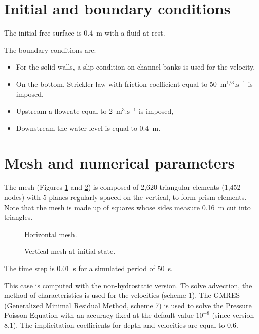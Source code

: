 \section{Initial and boundary conditions}
%
\bigskip
The initial free surface is 0.4~m with a fluid at rest.

\bigskip
The boundary conditions are:
\begin{itemize}
\item For the solid walls, a slip condition on channel banks is used for the velocity,
\item On the bottom, Strickler law with friction coefficient equal to
50~$\text{m}^{1/3}.\text{s}^{-1}$ is imposed,
\item Upstream a flowrate equal to 2~$\text{m}^{3}.\text{s}^{-1}$ is imposed,
\item Downstream the water level is equal to 0.4~m.
\end{itemize}

\section{Mesh and numerical parameters}
\bigskip
The mesh (Figures \ref{t3d:bump:fig:meshH} and \ref{t3d:bump:fig:meshV})  
is composed of 2,620 triangular elements (1,452 nodes) with 5 planes  
regularly spaced on the vertical, to form prism elements.
Note that the mesh is made up of squares whose sides measure 0.16~m cut into
triangles. 

\begin{figure}[!htbp]
 \centering
 \caption{Horizontal mesh.}
 \label{t3d:bump:fig:meshH}
\end{figure}
\begin{figure}[!htbp]
 \centering
 \caption{Vertical mesh  at initial state.}
 \label{t3d:bump:fig:meshV}
\end{figure}
\bigskip
The time step is 0.01~s for a simulated period of 50~s. 

\bigskip
This case is computed with the non-hydrostatic version.
To solve advection, the method of characteristics is used for the velocities (scheme 1).
The GMRES (Generalized Minimal Residual Method, scheme 7) is used to solve 
the Pressure Poisson Equation with an accuracy fixed at the default value
$10^{-8}$  (since version 8.1).
The implicitation coefficients for depth and velocities are equal to 0.6. 

